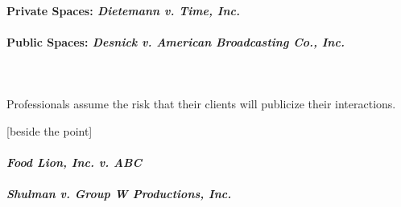 \paragraph{Private Spaces: \emph{Dietemann v. Time, Inc.}}


\paragraph{Public Spaces: \emph{Desnick v. American Broadcasting Co., Inc.}}
~\\\\
Professionals assume the risk that their clients will publicize their interactions.

[beside the point] %

\paragraph{\emph{Food Lion, Inc. v. ABC}}


\paragraph{\emph{Shulman v. Group W Productions, Inc.}}

